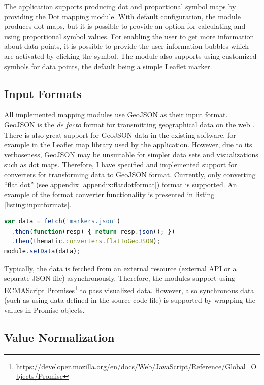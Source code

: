 The application supports producing dot and proportional symbol maps by providing the Dot mapping module. With default configuration, the module produces dot maps, but it is possible to provide an option for calculating and using proportional symbol values. For enabling the user to get more information about data points, it is possible to provide the user information bubbles which are activated by clicking the symbol. The module also supports using customized symbols for data points, the default being a simple Leaflet marker.

\subsection{Input Formats}

All implemented mapping modules use GeoJSON as their input format. GeoJSON is the \emph{de facto} format for transmitting geographical data on the web \citep{bostock_code_2013}. There is also great support for GeoJSON data in the existing software, for example in the Leaflet map library used by the application. However, due to its verboseness, GeoJSON may be unsuitable for simpler data sets and visualizations such as dot maps. Therefore, I have specified and implemented support for converters for transforming data to GeoJSON format. Currently, only converting ``flat dot'' (see appendix \ref{appendix:flatdotformat}) format is supported. An example of the format converter functionality is presented in listing \ref{listing:inputformats}.

\begin{lstlisting}[caption=An example code for using the flat dot input format converter.,language=JavaScript,label=listing:inputformats]
var data = fetch('markers.json')
  .then(function(resp) { return resp.json(); })
  .then(thematic.converters.flatToGeoJSON);
module.setData(data);
\end{lstlisting}

Typically, the data is fetched from an external resource (external API or a separate JSON file) asynchronously. Therefore, the modules support using ECMAScript Promises\footnote{\url{https://developer.mozilla.org/en/docs/Web/JavaScript/Reference/Global_Objects/Promise}} to pass visualized data. However, also synchronous data (such as using data defined in the source code file) is supported by wrapping the values in Promise objects.

\subsection{Value Normalization}


